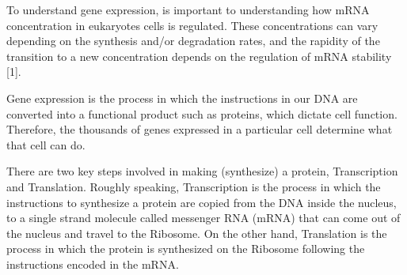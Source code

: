 To understand gene expression, is important to understanding how mRNA concentration in eukaryotes cells is regulated. These concentrations can vary depending on the synthesis and/or degradation rates, and the rapidity of the transition to a new concentration depends on the regulation of mRNA stability [1].


Gene expression is the process in which the instructions in our DNA are converted into a functional product such as proteins, which dictate cell function. Therefore, the thousands of genes expressed in a particular cell determine what that cell can do. 

There are two key steps involved in making (synthesize) a protein, Transcription and Translation. Roughly speaking, Transcription is the process in which the instructions to synthesize a protein are copied from the DNA inside the nucleus, to a single strand molecule called messenger RNA (mRNA) that can come out of the nucleus and travel to the Ribosome. On the other hand, Translation is the process in which the protein is synthesized on the Ribosome following the instructions encoded in the mRNA.
